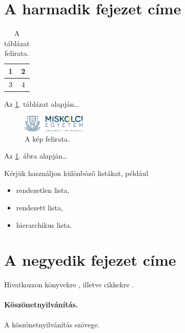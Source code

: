 \documentclass[a4paper,12pt]{article}
\begin{document}
\section{A harmadik fejezet címe}

\begin{table}[!ht] %
  \centering
  \begin{tabular}{|c|c|}
    \hline
    1 & 2 \\
    \hline
    3 & 4 \\
    \hline
  \end{tabular}
  \caption{A táblázat felirata.}\label{table:Key3}
\end{table}

Az \ref{table:Key3}. táblázat alapján\dots

\begin{figure}[!ht] %
  \centering
  \includegraphics[width=3cm]{ME_Logo.png}
  \caption{A kép felirata.}\label{figure:Key4}
\end{figure}

Az \ref{figure:Key4}. ábra alapján\dots

Kérjük használjon különböző listákat, például
\begin{itemize}
\item rendezetlen lista,
\item rendezett lista,
\item hierarchikus lista.
\end{itemize}

\section{A negyedik fejezet címe}%

Hivatkozzon könyvekre \cite{erdos2013}, illetve cikkekre \cite{aczel1983}.

\paragraph{Köszönetnyilvánítás.} A köszönetnyilvánítás szövege.



\end{document}
